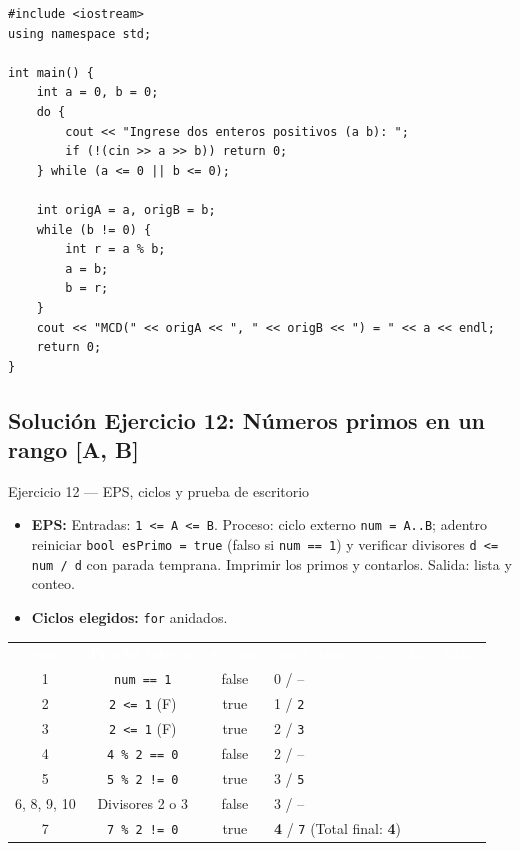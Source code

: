 \documentclass[11pt,letterpaper]{article}
\begin{document}
\begin{lstlisting}[style=cppmonitoria,caption={Solución Ejercicio 11: MCD por algoritmo de Euclides (C++)}]
#include <iostream>
using namespace std;

int main() {
    int a = 0, b = 0;
    do {
        cout << "Ingrese dos enteros positivos (a b): ";
        if (!(cin >> a >> b)) return 0;
    } while (a <= 0 || b <= 0);

    int origA = a, origB = b;
    while (b != 0) {
        int r = a % b;
        a = b;
        b = r;
    }
    cout << "MCD(" << origA << ", " << origB << ") = " << a << endl;
    return 0;
}
\end{lstlisting}

\subsection{Solución Ejercicio 12: Números primos en un rango [A, B]}

\begin{solucion}{Ejercicio 12 --- EPS, ciclos y prueba de escritorio}
\begin{itemize}
  \item \textbf{EPS:} Entradas: \texttt{1 <= A <= B}. Proceso: ciclo externo \texttt{num = A..B}; adentro reiniciar \texttt{bool esPrimo = true} (falso si \texttt{num == 1}) y verificar divisores \texttt{d <= num / d} con parada temprana. Imprimir los primos y contarlos. Salida: lista y conteo.
  \item \textbf{Ciclos elegidos:} \texttt{for} anidados.
\end{itemize}
\begin{center}
\footnotesize
\renewcommand{\arraystretch}{1.15}
\begin{tabularx}{0.9\linewidth}{c c c X}
\rowcolor{AzulMarino}
\textcolor{white}{\texttt{num}} & \textcolor{white}{\textbf{Prueba interna}} & \textcolor{white}{\texttt{esPrimo}} & \textcolor{white}{\texttt{contPrimos} / Salida (\texttt{A=1, B=10})} \\
1 & \texttt{num == 1} & false & 0 / -- \\
2 & \texttt{2 <= 1} (F) & true & 1 / \texttt{2} \\
3 & \texttt{2 <= 1} (F) & true & 2 / \texttt{3} \\
4 & \texttt{4 \% 2 == 0} & false & 2 / -- \\
5 & \texttt{5 \% 2 != 0} & true & 3 / \texttt{5} \\
6, 8, 9, 10 & Divisores 2 o 3 & false & 3 / -- \\
7 & \texttt{7 \% 2 != 0} & true & \textbf{4} / \texttt{7} (Total final: \textbf{4}) \\
\bottomrule
\end{tabularx}
\end{center}
\end{solucion}
\end{document}

